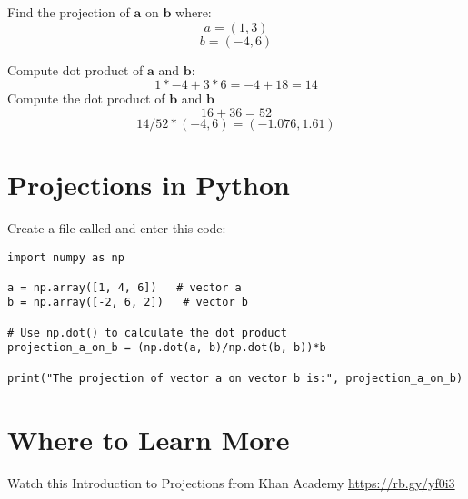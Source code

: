 \begin{Exercise}[title={Projections}, label=projections]
	Find the projection of $\mathbf{a}$ on $\mathbf{b}$ where:
	$$a = (1,3)$$
	$$b = (-4,6)$$
\end{Exercise}
\begin{Answer}[ref=project_vector]
	Compute dot product of $\mathbf{a}$ and $\mathbf{b}$:
	$$1*-4 + 3*6 = -4 +18 = 14$$
	Compute the dot product of $\mathbf{b}$ and $\mathbf{b}$
	$$16 + 36 = 52 $$
	$$14/52 * (-4,6) = (-1.076 , 1.61)$$
\end{Answer}
 
\section{Projections in Python}

Create a file called  and enter this code:
\begin{Verbatim}
import numpy as np
  
a = np.array([1, 4, 6])   # vector a
b = np.array([-2, 6, 2])   # vector b
  
# Use np.dot() to calculate the dot product
projection_a_on_b = (np.dot(a, b)/np.dot(b, b))*b
  
print("The projection of vector a on vector b is:", projection_a_on_b)
\end{Verbatim}
 
\section{Where to Learn More}

Watch this Introduction to Projections from Khan Academy 
\url{https://rb.gy/yf0i3}

